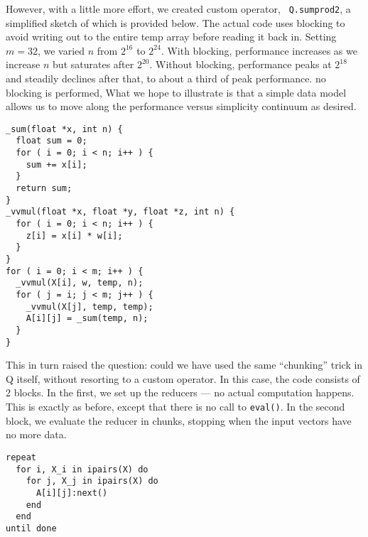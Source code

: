 However, with a little more effort, we created custom operator, {\tt
Q.sumprod2}, a simplified sketch of which is provided below. The actual code
uses blocking to avoid writing out to the entire temp array before reading it
back in. Setting \(m=32\), we varied \(n\) from \(2^{16}\) to \(2^{24}\). With
blocking, performance increases as we increase \(n\) but saturates after
\(2^{20}\). Without blocking, performance peaks at \(2^{18}\) and steadily
declines after that, to about a third of peak performance.
no blocking is performed,
What we hope to illustrate is that a
simple data model allows us to move along the performance versus simplicity
continuum as desired.
\begin{verbatim}
_sum(float *x, int n) {
  float sum = 0;
  for ( i = 0; i < n; i++ ) { 
    sum += x[i];
  }
  return sum;
}
_vvmul(float *x, float *y, float *z, int n) {
  for ( i = 0; i < n; i++ ) { 
    z[i] = x[i] * w[i];
  }
}
for ( i = 0; i < m; i++ ) { 
  _vvmul(X[i], w, temp, n);
  for ( j = i; j < m; j++ ) { 
    _vvmul(X[j], temp, temp);
    A[i][j] = _sum(temp, n);
  }
}
\end{verbatim}

This in turn raised the question: could we have used the same ``chunking'' trick
in Q itself, without resorting to a custom operator. In this case, the code
consists of 2 blocks. In the first, we set up the reducers --- no actual
computation happens. This is exactly as before, except that there is no call to
{\tt eval()}. In the second block, we evaluate the reducer in chunks, stopping
when the input vectors have no more data.
\begin{verbatim}
repeat 
  for i, X_i in ipairs(X) do
    for j, X_j in ipairs(X) do
      A[i][j]:next()
    end
  end
until done 
\end{verbatim}
